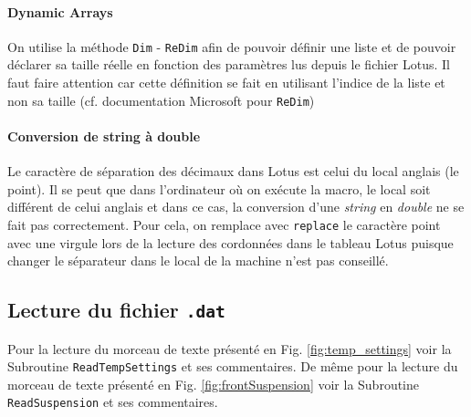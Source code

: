 \paragraph{Dynamic Arrays} On utilise la méthode \texttt{Dim} - \texttt{ReDim} afin de pouvoir définir une liste et de pouvoir déclarer sa taille réelle en fonction des paramètres lus depuis le fichier Lotus. Il faut faire attention car cette définition se fait en utilisant l'indice de la liste et non sa taille (cf. documentation Microsoft pour \texttt{ReDim})

\paragraph{Conversion de string à double} Le caractère de séparation des décimaux dans Lotus est celui du local anglais (le point). Il se peut que dans l'ordinateur où on exécute la macro, le local soit différent de celui anglais et dans ce cas, la conversion d'une \textit{string} en \textit{double} ne se fait pas correctement. Pour cela, on remplace avec \texttt{replace} le caractère point avec une virgule lors de la lecture des cordonnées dans le tableau Lotus puisque changer le séparateur dans le local de la machine n'est pas conseillé.

\subsection{Lecture du fichier \texttt{.dat}}%

\par Pour la lecture du morceau de texte présenté en Fig. \ref{fig:temp_settings} voir la Subroutine \texttt{ReadTempSettings} et ses commentaires.
De même pour la lecture du morceau de texte présenté en Fig. \ref{fig:frontSuspension} voir la Subroutine \texttt{ReadSuspension} et ses commentaires.

